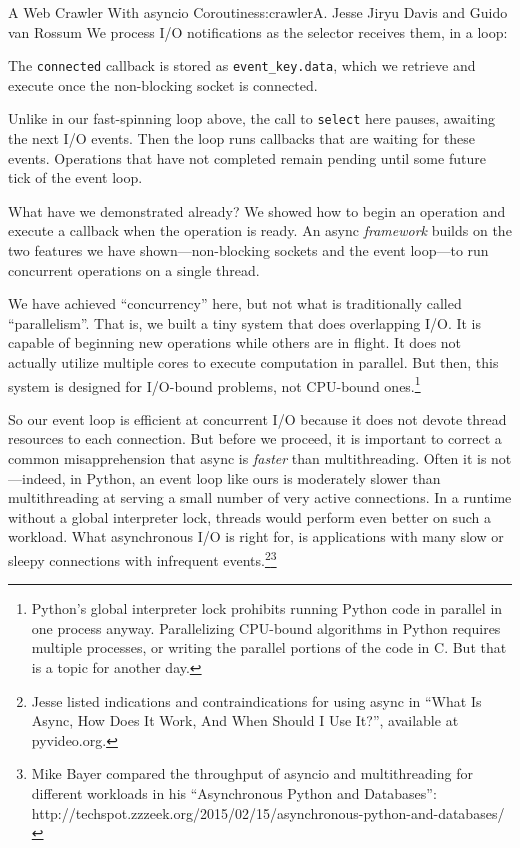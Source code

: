 \begin{aosachapter}{A Web Crawler With asyncio Coroutines}{s:crawler}{A. Jesse Jiryu Davis and Guido van Rossum}
We process I/O notifications as the selector receives them, in a loop:

\begin{Shaded}
\begin{Highlighting}[]
 
     \NormalTok{:}
         
\end{Highlighting}
\end{Shaded}

The \texttt{connected} callback is stored as \texttt{event\_key.data},
which we retrieve and execute once the non-blocking socket is connected.

Unlike in our fast-spinning loop above, the call to \texttt{select} here
pauses, awaiting the next I/O events. Then the loop runs callbacks that
are waiting for these events. Operations that have not completed remain
pending until some future tick of the event loop.

What have we demonstrated already? We showed how to begin an operation
and execute a callback when the operation is ready. An async
\emph{framework} builds on the two features we have shown---non-blocking
sockets and the event loop---to run concurrent operations on a single
thread.

We have achieved ``concurrency'' here, but not what is traditionally
called ``parallelism''. That is, we built a tiny system that does
overlapping I/O. It is capable of beginning new operations while others
are in flight. It does not actually utilize multiple cores to execute
computation in parallel. But then, this system is designed for I/O-bound
problems, not CPU-bound ones.\footnote{Python's global interpreter lock
  prohibits running Python code in parallel in one process anyway.
  Parallelizing CPU-bound algorithms in Python requires multiple
  processes, or writing the parallel portions of the code in C. But that
  is a topic for another day.}

So our event loop is efficient at concurrent I/O because it does not
devote thread resources to each connection. But before we proceed, it is
important to correct a common misapprehension that async is
\emph{faster} than multithreading. Often it is not---indeed, in Python,
an event loop like ours is moderately slower than multithreading at
serving a small number of very active connections. In a runtime without
a global interpreter lock, threads would perform even better on such a
workload. What asynchronous I/O is right for, is applications with many
slow or sleepy connections with infrequent events.\footnote{Jesse listed
  indications and contraindications for using async in ``What Is Async,
  How Does It Work, And When Should I Use It?'', available at
  pyvideo.org.}\footnote{Mike Bayer compared the throughput of asyncio
  and multithreading for different workloads in his ``Asynchronous
  Python and Databases'':
  http://techspot.zzzeek.org/2015/02/15/asynchronous-python-and-databases/}


\end{aosachapter}
